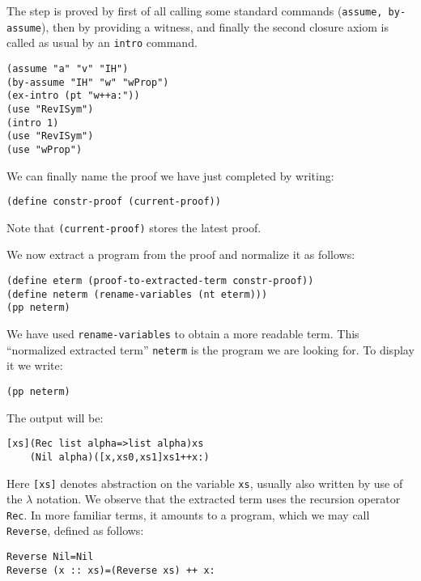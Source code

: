 \documentclass[12pt]{amsart}
\newcommand{\inquotes}[1]{``#1''}
\begin{document}
The step is proved by first of all calling some standard commands
(\texttt{assume, by-assume}), then by providing a witness, and
finally the second closure axiom is called as usual by an \texttt{intro}
command.
\begin{verbatim}
(assume "a" "v" "IH")
(by-assume "IH" "w" "wProp")
(ex-intro (pt "w++a:"))
(use "RevISym")
(intro 1)
(use "RevISym")
(use "wProp")
\end{verbatim}

We can finally name the proof we have just completed by writing:
\begin{verbatim}
(define constr-proof (current-proof))
\end{verbatim}

Note that \texttt{(current-proof)} stores the latest proof.

We now extract a program from the proof and normalize it as follows:
\begin{verbatim}
(define eterm (proof-to-extracted-term constr-proof))
(define neterm (rename-variables (nt eterm)))
(pp neterm)
\end{verbatim}

We have used \texttt{rename-variables} to obtain a more readable term.
This \inquotes{normalized extracted term} \texttt{neterm} is the
program we are looking for.  To display it we write:
\begin{verbatim}
(pp neterm)
\end{verbatim}

The output will be:
\begin{verbatim}
[xs](Rec list alpha=>list alpha)xs
    (Nil alpha)([x,xs0,xs1]xs1++x:)
\end{verbatim}

Here \texttt{[xs]} denotes abstraction on the variable \texttt{xs},
usually also written by use of the $\lambda$ notation.  We observe
that the extracted term uses the recursion operator \texttt{Rec}.  In
more familiar terms, it amounts to a program, which we may call
\texttt{Reverse}, defined as follows:
\begin{verbatim}
Reverse Nil=Nil
Reverse (x :: xs)=(Reverse xs) ++ x:
\end{verbatim}


\end{document}
